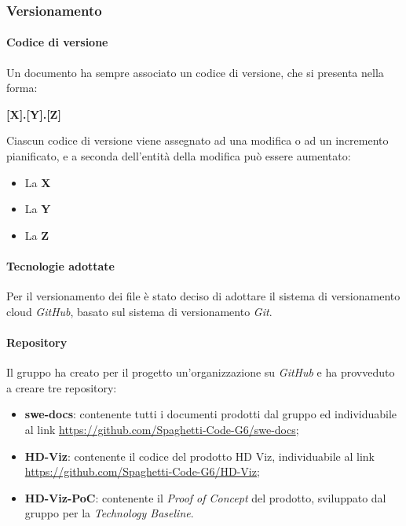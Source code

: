 \subsubsection{Versionamento}
\label{ssub:versionamento}

\paragraph{Codice di versione}
\label{par:codice_versione}

Un documento ha sempre associato un codice di versione, che si presenta nella forma:
\begin{center}
    \textbf{[X].[Y].[Z]}
\end{center}
Ciascun codice di versione viene assegnato ad una modifica o ad un incremento pianificato, e a seconda dell'entit\`{a} della modifica pu\`{o} essere aumentato:
\begin{itemize}
	\item La \textbf{X}
	\item La \textbf{Y}
	\item La \textbf{Z}
\end{itemize}

\paragraph{Tecnologie adottate}
\label{par:tecnologie}

Per il versionamento dei file è stato deciso di adottare il sistema di versionamento cloud \emph{GitHub}, basato sul 
sistema di versionamento \emph{Git}.

\paragraph{Repository}
\label{par:repo}

Il gruppo ha creato per il progetto un'organizzazione su \emph{GitHub} e ha provveduto a creare tre repository:
\begin{itemize}
    \item \textbf{swe-docs}: contenente tutti i documenti prodotti dal gruppo ed individuabile al link 
    	\url{https://github.com/Spaghetti-Code-G6/swe-docs};
    \item \textbf{HD-Viz}: contenente il codice del prodotto HD Viz, individuabile al link \url{https://github.com/Spaghetti-Code-G6/HD-Viz};
    \item \textbf{HD-Viz-PoC}: contenente il \emph{Proof of Concept} del prodotto, sviluppato dal gruppo per la \emph{Technology Baseline}.
\end{itemize}

